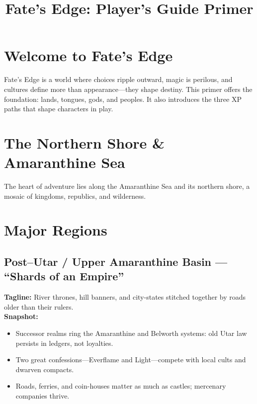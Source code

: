 \documentclass[11pt]{article}
\begin{document}
\title{Fate's Edge: Player's Guide Primer}
\author{}
\date{}
\maketitle

\tableofcontents

\section{Welcome to Fate's Edge}
Fate's Edge is a world where choices ripple outward, magic is perilous, and cultures define more than appearance—they shape destiny. 
This primer offers the foundation: lands, tongues, gods, and peoples. It also introduces the three XP paths that shape characters in play.

\section{The Northern Shore \& Amaranthine Sea}
The heart of adventure lies along the Amaranthine Sea and its northern shore, a mosaic of kingdoms, republics, and wilderness.

\section{Major Regions}
\subsection*{Post–Utar / Upper Amaranthine Basin — “Shards of an Empire”}
\textbf{Tagline:} River thrones, hill banners, and city-states stitched together by roads older than their rulers.\\
\textbf{Snapshot:}
\begin{itemize}
  \item Successor realms ring the Amaranthine and Belworth systems: old Utar law persists in ledgers, not loyalties.
  \item Two great confessions—Everflame and Light—compete with local cults and dwarven compacts.
  \item Roads, ferries, and coin-houses matter as much as castles; mercenary companies thrive.
\end{itemize}
\end{document}
